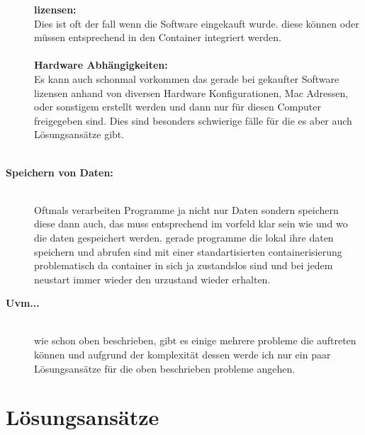 \begin{description}
	\textbf{lizensen:} \\ Dies ist oft der fall wenn die Software eingekauft wurde. diese können oder müssen entsprechend in den Container integriert werden. \\ \\
	\textbf{Hardware Abhängigkeiten:} \\ Es kann auch schonmal vorkommen das gerade bei gekaufter Software lizensen anhand von diversen Hardware Konfigurationen, Mac Adressen, oder sonstigem erstellt werden und dann nur für diesen Computer freigegeben sind. Dies sind besonders schwierige fälle für die es aber auch Lösungsansätze gibt. \\ \\

	\item[\textbf{Speichern von Daten:}]\hfill \\ Oftmals verarbeiten Programme ja nicht nur Daten sondern speichern diese dann auch, das muss entsprechend im vorfeld klar sein wie und wo die daten gespeichert werden. gerade programme die lokal ihre daten speichern und abrufen sind mit einer standartisierten containerisierung problematisch da container in sich ja zustandslos sind und bei jedem neustart immer wieder den urzustand wieder erhalten. \\
	\item[\textbf{Uvm...}]\hfill \\ wie schon oben beschrieben, gibt es einige mehrere probleme die auftreten können und aufgrund der komplexität dessen werde ich nur ein paar Lösungsansätze für die oben beschrieben probleme angehen. \\
\end{description}

\section{Lösungsansätze}

